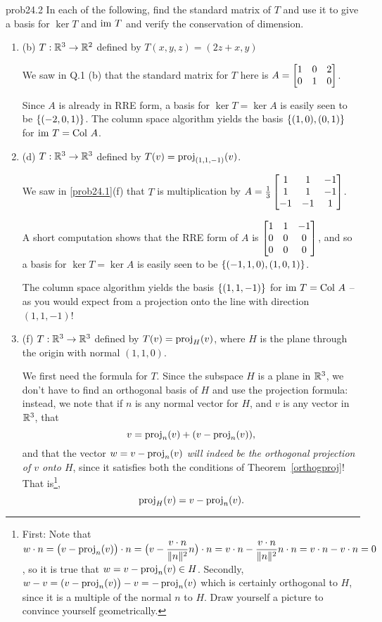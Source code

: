 \begin{sol}{prob24.2} In each of the following, find the standard matrix of $T$ and use it to give a basis for $\ker T$ and $\operatorname{im}\, T$ and verify the conservation of dimension.

\medskip
\begin{enumerate}[]


\item (b) $T:\mathbb{R}^3 \to \mathbb{R}^2$ defined by $T(x,y,z)=(2 z+x, y)$

\soln We saw in Q.1 (b) that the standard matrix for $T$ here is $A=\bmatrix 1&0&2\\0&1&0 \endbmatrix$.

Since $A$ is already in RRE form, a basis for $\ker T= \ker A$ is easily seen to be $\{(-2,0,1) \}$. The column space algorithm yields the basis $\{(1,0), (0,1) \}$ for  $\operatorname{im}\, T = \operatorname{Col\,} A$.
\medskip
%


\item (d) $T:\mathbb{R}^3 \to \mathbb{R}^3$ defined by $T(v)= \operatorname{proj}_{(1,1,-1)}(v)$.

\soln We saw in \ref{prob24.1}(f) that  $T$ is multiplication by $A= \frac13\bmatrix
 1& 1& -1\\
 1& 1& -1\\ 
-1& -1& 1\endbmatrix$. 

A short computation shows that the RRE form of $A$ is $\bmatrix 1 & 1 & -1 \\
 0 & 0 & 0 \\
 0 & 0 & 0  \endbmatrix$, and so a basis for $\ker T= \ker A$ is easily seen to be $\{(-1,1,0),(1,0,1) \}$.

The column space algorithm yields the basis $\{(1,1,-1) \}$ for  $\operatorname{im}\, T = \operatorname{Col\,} A$ -- as you would expect from a projection onto the line with direction $(1,1,-1)$! 
\medskip


\item (f) $T:\mathbb{R}^3 \to \mathbb{R}^3$ defined by $T(v)= \operatorname{proj}_H(v)$, where $H$ is the plane through the origin with normal $(1,1,0)$.

\soln We first need the formula for $T$. Since the 
subspace $H$ is a plane in $\mathbb{R}^3$, we  don't have to find an orthogonal basis of $H$ and use the projection formula: instead, we note that if $n$ is any normal vector for $H$, and $v$ is any vector in $\mathbb{R}^3$, that
$$ v= \operatorname{proj}_n(v) + (v-\operatorname{proj}_n(v)),$$ and that the vector $w=v-\operatorname{proj}_n(v)$ {\it will indeed be the orthogonal projection of $v$ onto $H$}, since it satisfies both the conditions of Theorem~\ref{orthogproj}! That is\footnote{First: Note that $w\cdot n=\big(v-\operatorname{proj}_n(v)\big)\cdot n =\big( v- \dfrac{v\cdot n}{\|n\|^2}n\big)\cdot n= v\cdot n - \dfrac{v\cdot n}{\|n\|^2}n\cdot n=v\cdot n-v\cdot n=0$, so it is true that $w=v-\operatorname{proj}_n(v) \in H$. Secondly, $w-v=(v-\operatorname{proj}_n(v)\big)-v= -\operatorname{proj}_n(v)$ which is certainly orthogonal to $H$, since it is a multiple of the normal $n$ to $H$. Draw yourself a picture to convince yourself geometrically.}, 
$$   \operatorname{proj}_H(v)=  v-\operatorname{proj}_n(v). $$


\end{enumerate}
\end{sol}
